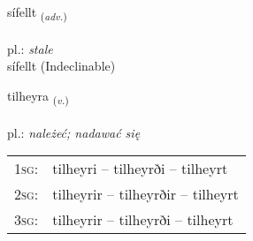 \documentclass[frontgrid, backgrid]{flacards}\usepackage[]{graphicx}\usepackage[]{xcolor}
\begin{document}

\renewcommand{\flhead}{\vskip5pt \fboxsep=0pt {\small\bfseries\footnotesize Atviksorð | Adverb}}
\renewcommand{\fcfoot}{\vskip5pt \fboxsep=0pt \hspace{2pt}{\small\bfseries\footnotesize 2K}}

\renewcommand{\blhead}{\vskip5pt {\small\bfseries\footnotesize Atviksorð | Adverb }}
\renewcommand{\bcfoot}{\vskip5pt \hspace{2pt}{\small\bfseries\footnotesize 2K}}


{sífellt \small{\textsubscript{(\textit{adv.})}} \\[1ex]
\textphonetic{[siːfɛl̥t]} \\
pl.: \emph{stale} \\  [2ex]
sífellt (Indeclinable)}

\renewcommand{\flhead}{\vskip5pt \fboxsep=0pt {\small\bfseries\footnotesize Sagnorð | Verb}}
\renewcommand{\fcfoot}{\vskip5pt \fboxsep=0pt \hspace{2pt}{\small\bfseries\footnotesize 2K}}

\renewcommand{\blhead}{\vskip5pt {\small\bfseries\footnotesize Sagnorð | Verb }}
\renewcommand{\bcfoot}{\vskip5pt \hspace{2pt}{\small\bfseries\footnotesize 2K}}


{tilheyra \small{\textsubscript{(\textit{v.})}} \\[1ex] %
\textphonetic{[tʰɪlheira]} \\
pl.: \emph{należeć; nadawać się} \\  [2ex]
\renewcommand*{\arraystretch}{0.8}
\begin{tabular}{p{1cm}l}
\textsc{1sg}: & tilheyri -- tilheyrði -- tilheyrt \\ 
\textsc{2sg}: & tilheyrir -- tilheyrðir -- tilheyrt \\ 
\textsc{3sg}: & tilheyrir -- tilheyrði -- tilheyrt \\ 
\end{tabular}
}
\end{document}
